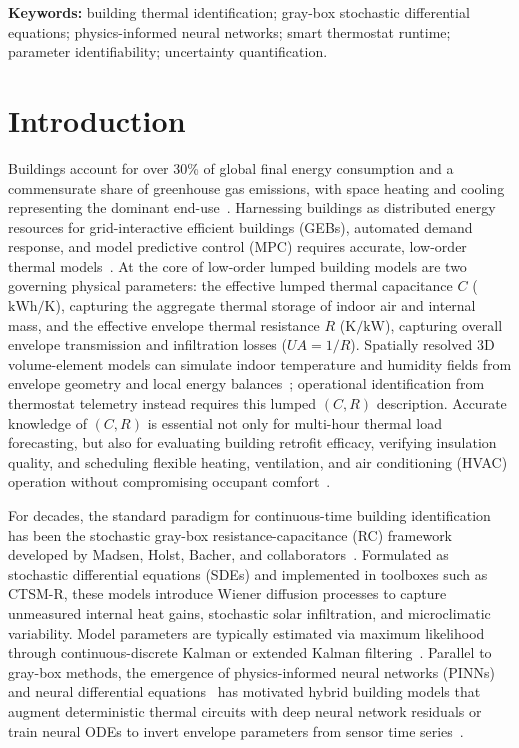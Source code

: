 \documentclass[11pt,letterpaper]{article}
\begin{document}
\vspace{0.2em}
\noindent\textbf{Keywords:} building thermal identification; gray-box stochastic differential equations; physics-informed neural networks; smart thermostat runtime; parameter identifiability; uncertainty quantification.
\vspace{0.75em}

\section{Introduction}
\label{sec:intro}

Buildings account for over 30\% of global final energy consumption and a commensurate share of greenhouse gas emissions, with space heating and cooling representing the dominant end-use~\cite{reynders2014,deconinck2016}. Harnessing buildings as distributed energy resources for grid-interactive efficient buildings (GEBs), automated demand response, and model predictive control (MPC) requires accurate, low-order thermal models~\cite{gokhale2022,chen2023physcon}. At the core of low-order lumped building models are two governing physical parameters: the effective lumped thermal capacitance $C$ ($\mathrm{kWh/K}$), capturing the aggregate thermal storage of indoor air and internal mass, and the effective envelope thermal resistance $R$ ($\mathrm{K/kW}$), capturing overall envelope transmission and infiltration losses ($UA = 1/R$). Spatially resolved 3D volume-element models can simulate indoor temperature and humidity fields from envelope geometry and local energy balances~\cite{yang2018vem}; operational identification from thermostat telemetry instead requires this lumped $(C,R)$ description. Accurate knowledge of $(C, R)$ is essential not only for multi-hour thermal load forecasting, but also for evaluating building retrofit efficacy, verifying insulation quality, and scheduling flexible heating, ventilation, and air conditioning (HVAC) operation without compromising occupant comfort~\cite{bacher2011,rouchier2018}.

For decades, the standard paradigm for continuous-time building identification has been the stochastic gray-box resistance-capacitance (RC) framework developed by Madsen, Holst, Bacher, and collaborators~\cite{madsen1995,andersen2000,kristensen2004,bacher2011,thilker2021,jimenez2008}. Formulated as stochastic differential equations (SDEs) and implemented in toolboxes such as CTSM-R, these models introduce Wiener diffusion processes to capture unmeasured internal heat gains, stochastic solar infiltration, and microclimatic variability. Model parameters are typically estimated via maximum likelihood through continuous-discrete Kalman or extended Kalman filtering~\cite{kristensen2004,sarkka2013}. Parallel to gray-box methods, the emergence of physics-informed neural networks (PINNs)~\cite{raissi2019} and neural differential equations~\cite{chen2018node,li2020sde,kidger2021sde} has motivated hybrid building models that augment deterministic thermal circuits with deep neural network residuals or train neural ODEs to invert envelope parameters from sensor time series~\cite{gokhale2022,chen2023physcon,dinatale2022,sievers2023,kim2025,liu2025etp}.
\end{document}
